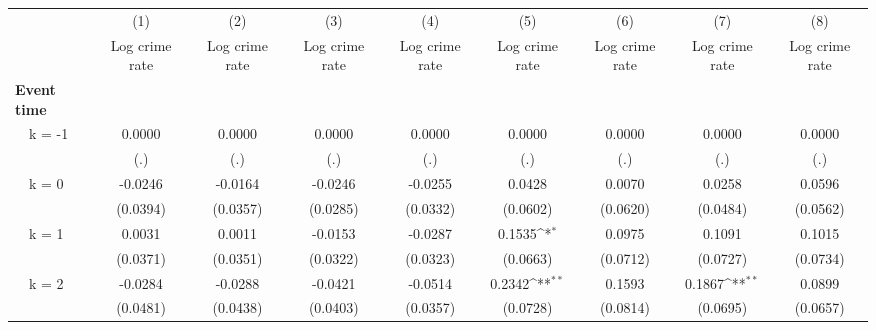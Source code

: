 {
\def\sym#1{\ifmmode^{#1}\else\(^{#1}\)\fi}
\begin{tabular}{l*{8}{c}}
\toprule
                &\multicolumn{1}{c}{(1)}&\multicolumn{1}{c}{(2)}&\multicolumn{1}{c}{(3)}&\multicolumn{1}{c}{(4)}&\multicolumn{1}{c}{(5)}&\multicolumn{1}{c}{(6)}&\multicolumn{1}{c}{(7)}&\multicolumn{1}{c}{(8)}\\
                &\multicolumn{1}{c}{Log crime rate}&\multicolumn{1}{c}{Log crime rate}&\multicolumn{1}{c}{Log crime rate}&\multicolumn{1}{c}{Log crime rate}&\multicolumn{1}{c}{Log crime rate}&\multicolumn{1}{c}{Log crime rate}&\multicolumn{1}{c}{Log crime rate}&\multicolumn{1}{c}{Log crime rate}\\
\midrule
\textbf{Event time}&                  &                  &                  &                  &                  &                  &                  &                  \\
\addlinespace
~~k = -1        &   0.0000         &   0.0000         &   0.0000         &   0.0000         &   0.0000         &   0.0000         &   0.0000         &   0.0000         \\
                &      (.)         &      (.)         &      (.)         &      (.)         &      (.)         &      (.)         &      (.)         &      (.)         \\
\addlinespace
~~k = 0         &  -0.0246         &  -0.0164         &  -0.0246         &  -0.0255         &   0.0428         &   0.0070         &   0.0258         &   0.0596         \\
                & (0.0394)         & (0.0357)         & (0.0285)         & (0.0332)         & (0.0602)         & (0.0620)         & (0.0484)         & (0.0562)         \\
\addlinespace
~~k = 1         &   0.0031         &   0.0011         &  -0.0153         &  -0.0287         &   0.1535\sym{*}  &   0.0975         &   0.1091         &   0.1015         \\
                & (0.0371)         & (0.0351)         & (0.0322)         & (0.0323)         & (0.0663)         & (0.0712)         & (0.0727)         & (0.0734)         \\
\addlinespace
~~k = 2         &  -0.0284         &  -0.0288         &  -0.0421         &  -0.0514         &   0.2342\sym{**} &   0.1593         &   0.1867\sym{**} &   0.0899         \\
                & (0.0481)         & (0.0438)         & (0.0403)         & (0.0357)         & (0.0728)         & (0.0814)         & (0.0695)         & (0.0657)         \\

\end{tabular}}
